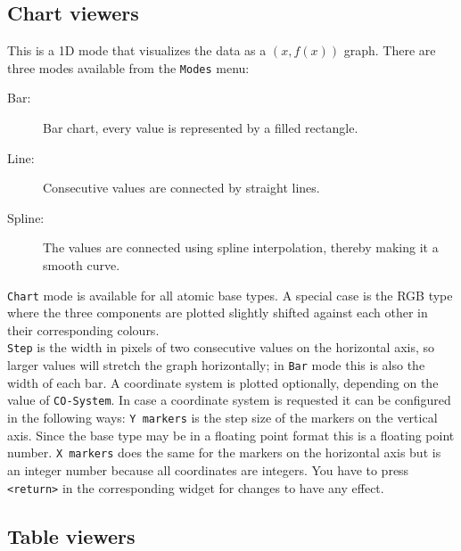\documentclass[11pt]{article}
\begin{document}
\subsection{Chart viewers}
\label{ChartDisplayMode}

This is a 1D mode that visualizes the data as a $(x, f(x))$ graph. There are three
modes available from the \texttt{Modes} menu:

\begin{description}
\item[Bar:] Bar chart, every value is represented by a filled rectangle.
\item[Line:] Consecutive values are connected by straight lines.
\item[Spline:] The values are connected using spline interpolation, thereby
making it a smooth curve.
\end{description}

\texttt{Chart} mode is available for all atomic base types. A special case is
the RGB type where the three components are plotted slightly shifted against
each other in their corresponding colours.\\
\texttt{Step} is the width in pixels of two consecutive values on the horizontal
axis, so larger values will stretch the graph horizontally; in \texttt{Bar} mode this
is also the width of each bar. A coordinate system is plotted optionally, depending
on the value of \texttt{CO-System}. In case a coordinate system is requested it can
be configured in the following ways: \texttt{Y markers} is the step size of the markers
on the vertical axis. Since the base type may be in a floating point format this is
a floating point number. \texttt{X markers} does the same for the markers on the horizontal
axis but is an integer number because all coordinates are integers. You have to press
\texttt{<return>} in the corresponding widget for changes to have any effect.


\subsection{Table viewers}
\label{TableDisplayMode}
\end{document}
